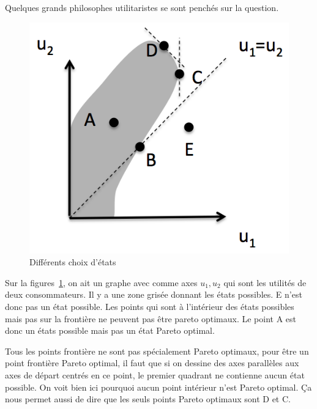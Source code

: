 Quelques grands philosophes utilitaristes se sont penchés sur la question.
\begin{figure}
  \centering
  \includegraphics{pareto.png}
  \caption{Différents choix d'états}
  \label{fig:pareto}
\end{figure}
Sur la figures~\ref{fig:pareto},
on ait un graphe avec comme axes $u_1,u_2$ qui sont les
utilités de deux consommateurs.
Il y a une zone grisée donnant les états possibles.
E n'est donc pas un état possible.
Les points qui sont à l'intérieur des états possibles mais pas sur
la frontière ne peuvent pas être pareto optimaux.
Le point A est donc un états possible mais pas un état Pareto optimal.

Tous les points frontière ne sont pas spécialement Pareto optimaux,
pour être un point frontière Pareto optimal,
il faut que si on dessine des axes parallèles aux axes de départ
centrés en ce point, le premier quadrant ne contienne aucun état possible.
On voit bien ici pourquoi aucun point intérieur n'est Pareto optimal.
Ça nous permet aussi de dire que les seuls points Pareto optimaux sont
D et C.

